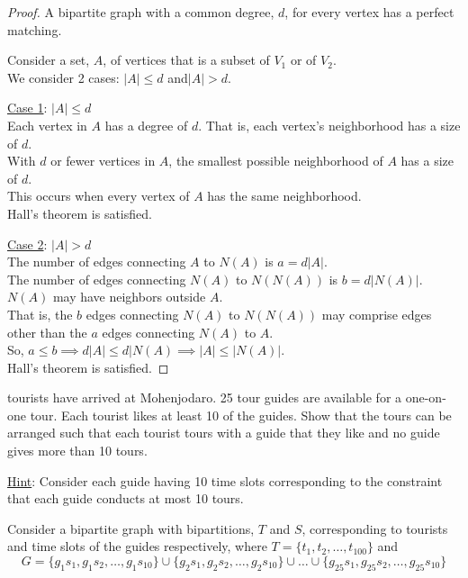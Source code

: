 \documentclass[a4paper]{exam}
\begin{document}
\begin{questions}
\begin{solution}
    \begin{proof} A bipartite graph with a common degree, $d$, for every vertex has a perfect matching.

      Consider a set, $A$, of vertices that is a subset of $V_1$ or of $V_2$.\\
      We consider 2 cases: $|A|\le d$ and$|A|> d$.

      \underline{Case 1}: $|A| \le d$\\
      Each vertex in $A$ has a degree of $d$. That is, each vertex's neighborhood has a size of $d$.\\
      With $d$ or fewer vertices in $A$, the smallest possible neighborhood of $A$ has a size of $d$.\\
      This occurs when every vertex of $A$ has the same neighborhood.\\
      Hall's theorem is satisfied.

      \underline{Case 2}: $|A| > d$\\
      The number of edges connecting $A$ to $N(A)$ is $a = d|A|$.\\
      The number of edges connecting $N(A)$ to $N(N(A))$ is $b = d|N(A)|$.\\
      $N(A)$ may have neighbors outside $A$.\\
      That is, the $b$ edges connecting $N(A)$ to $N(N(A))$ may comprise edges other than the $a$ edges connecting $N(A)$ to $A$.\\
      So, $a\le b \implies d|A| \le d|N(A) \implies |A| \le |N(A)|$.\\
      Hall's theorem is satisfied.
    \end{proof}
  \end{solution}

   tourists have arrived at Mohenjodaro. 25 tour guides are available for a one-on-one tour. Each tourist likes at least 10 of the guides. Show that the tours can be arranged such that each tourist tours with a guide that they like and no guide gives more than 10 tours.

  \underline{Hint}: Consider each guide having 10 time slots corresponding to the constraint that each guide conducts at most 10 tours.
  \begin{solution}
    Consider a bipartite graph with bipartitions, $T$ and $S$, corresponding to tourists and time slots of the guides respectively, where $T=\{t_1,t_2,\ldots,t_{100}\}$ and
    \[
      G = \{g_1s_1, g_1s_2,\ldots, g_1s_{10}\} \cup \{g_2s_1, g_2s_2,\ldots, g_2s_{10}\} \cup \ldots \cup \{g_{25}s_1, g_{25}s_2,\ldots, g_{25}s_{10}\}
    \]
        


\end{solution}
\end{questions}
\end{document}
